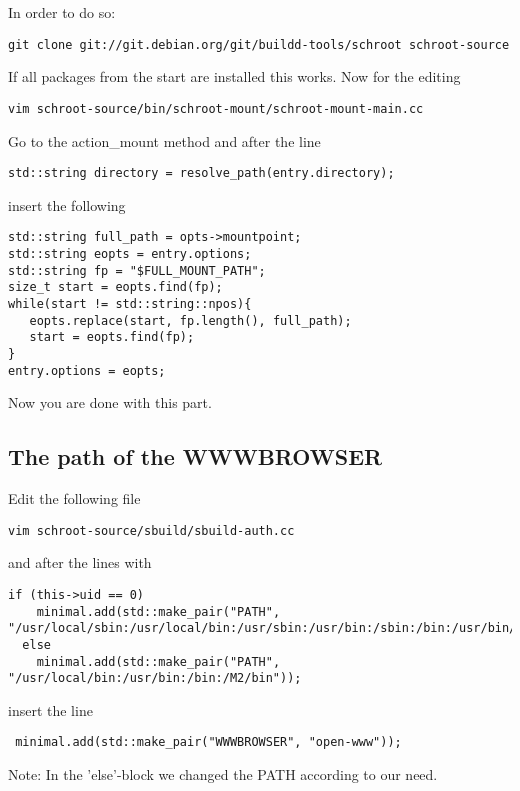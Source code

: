 \documentclass[a4paper]{book}
\begin{document}
In order to do so:

\begin{verbatim}
git clone git://git.debian.org/git/buildd-tools/schroot schroot-source
\end{verbatim}

If all packages from the start are installed this works.
Now for the editing

\begin{verbatim}
vim schroot-source/bin/schroot-mount/schroot-mount-main.cc
\end{verbatim}

Go to the action\_mount method and after the line

\begin{verbatim}
std::string directory = resolve_path(entry.directory);
\end{verbatim}

insert the following

\begin{verbatim}
std::string full_path = opts->mountpoint;
std::string eopts = entry.options;
std::string fp = "$FULL_MOUNT_PATH";
size_t start = eopts.find(fp);
while(start != std::string::npos){
   eopts.replace(start, fp.length(), full_path);
   start = eopts.find(fp);
}
entry.options = eopts;
\end{verbatim}


Now you are done with this part.
\subsection{The path of the WWWBROWSER}
Edit the following file

\begin{verbatim}
vim schroot-source/sbuild/sbuild-auth.cc
\end{verbatim}
and after the lines with

\begin{verbatim}
if (this->uid == 0)
    minimal.add(std::make_pair("PATH", "/usr/local/sbin:/usr/local/bin:/usr/sbin:/usr/bin:/sbin:/bin:/usr/bin/X11"));
  else
    minimal.add(std::make_pair("PATH", "/usr/local/bin:/usr/bin:/bin:/M2/bin"));
\end{verbatim}
insert the line

\begin{verbatim}
 minimal.add(std::make_pair("WWWBROWSER", "open-www"));
\end{verbatim}

Note: In the 'else'-block we changed the PATH according to our need.
\end{document}
